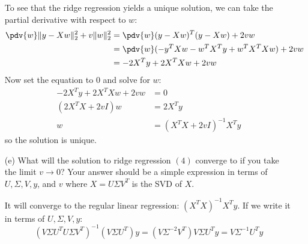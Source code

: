 \documentclass{article}
\begin{document}
\begin{itemize}
\begin{answer}
                To see that the ridge regression yields a unique solution, we can take the partial derivative with respect to $w$:
                    \begin{align*}
                        \pdv{w} \lVert y - Xw \rVert^{2}_{2} + v \lVert w \rVert^{2}_{2} &= \pdv{w} (y - Xw)^{T}(y - Xw) + 2vw                   \\
                                                                                         &= \pdv{w}(-y^{T}Xw - w^{T}X^{T}y + w^{T}X^{T}Xw) + 2vw \\
                                                                                         &= -2X^{T}y + 2X^{T}Xw + 2vw                              
                    \end{align*}
                Now set the equation to $0$ and solve for $w$:
                    \begin{align*}
                        -2X^{T}y + 2X^{T}Xw + 2vw &= 0                         \\
                        (2X^{T}X + 2vI)w          &= 2X^{T}y                   \\
                        w                         &= (X^{T}X + 2vI)^{-1}X^{T}y   
                    \end{align*}
                so the solution is unique.
            \end{answer}

        \item [(e)] What will the solution to ridge regression $(4)$ converge to if you take the limit $v \rightarrow 0$? Your answer should be a simple expression in terms of $U, \Sigma, V, y$, and $v$ where $X = U\Sigma V^{T}$ is the SVD of $X$.
            \begin{answer}
                It will converge to the regular linear regression: $(X^{T}X)^{-1}X^{T}y$. If we write it in terms of $U, \Sigma, V, y$:
                    \begin{equation*}
                        (V\Sigma U^{T} U\Sigma V^{T})^{-1}(V\Sigma U^{T})y = (V\Sigma^{-2} V^{T})V\Sigma U^{T}y = V\Sigma^{-1} U^{T}y
                    \end{equation*}
            \end{answer}


\end{itemize}
\end{document}
